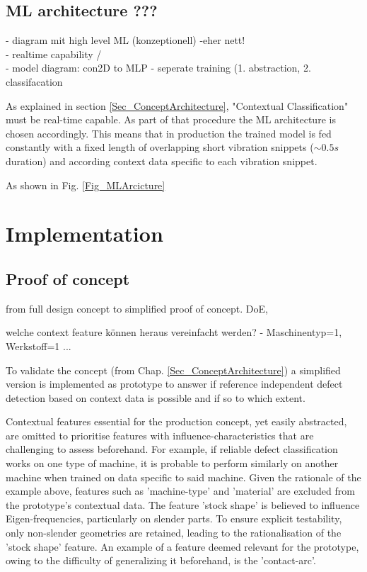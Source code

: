 \documentclass[5p,times,procedia]{elsarticle}
\newenvironment{note}{%
	\noindent
    \color{notecolor}%
}{%
    \par\medskip%
}
\begin{document}
\subsection{ML architecture ???}
\vspace*{-\baselineskip}
\begin{note}
	- diagram mit high level ML (konzeptionell) -eher nett!\\
	- realtime capability /\\
	- model diagram: con2D to MLP
	- seperate training (1. abstraction, 2. classifacation
\end{note}


As explained in section \ref{Sec_ConceptArchitecture}, "Contextual Classification" must be real-time capable. As part of that procedure the ML architecture is chosen accordingly. This means that in production the trained model is fed constantly with a fixed length of overlapping short vibration snippets ($\sim0.5 s$ duration) and according context data specific to each vibration snippet. 

As shown in Fig. \ref{Fig_MLArcicture} 



\section{Implementation}
\subsection{Proof of concept}
\vspace*{-\baselineskip}
\begin{note}
from full design concept to simplified proof of concept.
DoE,  

welche context feature können heraus vereinfacht werden? - Maschinentyp=1, Werkstoff=1 ...
\end{note}


To validate the concept (from Chap. \ref{Sec_ConceptArchitecture}) a simplified version is implemented as prototype to answer if reference independent defect detection based on context data is possible and if so to which extent.

Contextual features essential for the production concept, yet easily abstracted, are omitted to prioritise features with influence-characteristics that are challenging to assess beforehand. For example, if reliable defect classification works on one type of machine, it is probable to perform similarly on another machine when trained on data specific to said machine.
Given the rationale of the example above, features such as 'machine-type' and 'material' are excluded from the prototype's contextual data.
The feature 'stock shape' is believed to influence Eigen-frequencies, particularly on slender parts. To ensure explicit testability, only non-slender geometries are retained, leading to the rationalisation of the 'stock shape' feature.
An example of a feature deemed relevant for the prototype, owing to the difficulty of generalizing it beforehand, is the 'contact-arc'.
\end{document}
